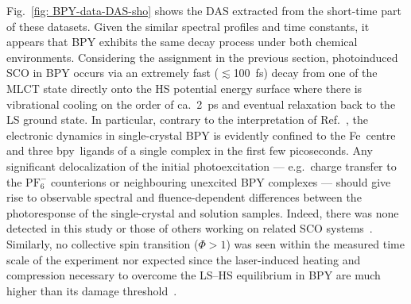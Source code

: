 Fig.~\ref{fig: BPY-data-DAS-sho} shows the DAS extracted from the short-time part
of these datasets.
%
Given the similar spectral profiles and time constants,
it appears that BPY exhibits the same decay process under both chemical environments.
%
Considering the assignment in the previous section,
photoinduced SCO in BPY occurs via an extremely fast ($\lesssim$100~fs) decay
from one of the $\mathrm{MLCT}$ state directly onto
the HS potential energy surface where there is vibrational cooling
on the order of ca.~2~ps and eventual relaxation back to the LS ground state.
%
In particular, contrary to the interpretation of Ref.~\cite{Freyer2013},
the electronic dynamics in single-crystal BPY is evidently confined to
the Fe~centre and three bpy~ligands of a single complex
in the first few picoseconds.
%
Any significant delocalization of the initial photoexcitation ---
e.g.~charge transfer to the $\mathrm{PF_6^-}$ counterions or neighbouring unexcited BPY complexes ---
should give rise to observable spectral and fluence-dependent differences
between the photoresponse of the single-crystal and solution samples.
%
Indeed, there was none detected in this study or those of others working on
related SCO systems~\cite{Tissot2011, Lorenc2012, Collet2012a, Collet2012b, Bertoni2016a, Bertoni2016b}.
%
Similarly, no collective spin transition ($\Phi > 1$)
was seen within the measured time scale of the experiment nor expected
since the laser-induced heating and compression necessary to
overcome the LS--HS equilibrium in BPY are much higher than
its damage threshold~\cite{SCO-II}.


